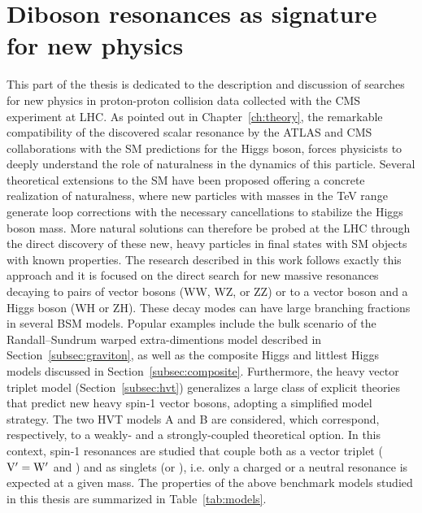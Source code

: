 \chapter{Diboson resonances as signature for new physics}
\label{ch:dibosonIntro}

This part of the thesis is dedicated to the description and discussion of searches for new physics in proton-proton collision data collected with the CMS experiment at LHC.
As pointed out in Chapter~\ref{ch:theory}, the remarkable compatibility of the discovered scalar resonance by the ATLAS and CMS collaborations with the SM predictions for the Higgs boson,
forces physicists to deeply understand the role of naturalness in the dynamics of this particle.
Several theoretical extensions to the SM have been proposed offering a concrete realization of naturalness,
where new particles with masses in the TeV range generate loop corrections with the necessary cancellations to stabilize the Higgs boson mass.
More natural solutions can therefore be probed at the LHC through the direct discovery of these new, heavy particles in final states with SM objects with known properties.
The research described in this work follows exactly this approach and it is focused on the direct search for new massive resonances decaying to
pairs of vector bosons (WW, WZ, or ZZ) or to a vector boson and a Higgs boson (WH or ZH).
These decay modes can have large branching fractions in several BSM models. 
Popular examples include the bulk scenario of the Randall--Sundrum warped extra-dimentions model described in Section~\ref{subsec:graviton},
as well as the composite Higgs and littlest Higgs models discussed in Section~\ref{subsec:composite}.
Furthermore, the heavy vector triplet model (Section~\ref{subsec:hvt}) generalizes a large class of explicit theories that predict new heavy spin-1 vector bosons,
adopting a simplified model strategy. The two HVT models A and B are considered, which correspond, respectively, to a weakly- and a strongly-coupled theoretical option.
In this context, spin-1 resonances are studied that couple both as a vector triplet ($\mathrm{V}^\prime = \mathrm{W}^\prime$ and \Zpr) and as singlets (\Wpr or \Zpr), i.e. only a charged or a neutral resonance is expected at a given mass.
The properties of the above benchmark models studied in this thesis are summarized in Table~\ref{tab:models}.\\

